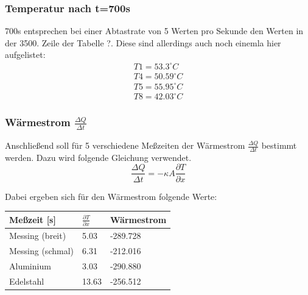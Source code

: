 \subsubsection{Temperatur nach t=700s}

700s entsprechen bei einer Abtastrate von 5 Werten pro Sekunde den Werten in der 3500. Zeile der Tabelle ?. Diese sind allerdings auch noch einemla hier aufgelistet:
\begin{align*}
    T1 = 53.3 ^\circ C  \\
    T4 = 50.59 ^\circ C \\
    T5 = 55.95 ^\circ C \\
    T8 = 42.03 ^\circ C 
\end{align*}

\subsubsection{Wärmestrom $\frac{\Delta Q}{\Delta t}$}

Anschließend soll für 5 verschiedene Meßzeiten der Wärmestrom $\frac{\Delta Q}{\Delta t}$ bestimmt werden. Dazu wird folgende Gleichung verwendet. 
\begin{displaymath}
    \frac{\Delta Q}{\Delta t} = - \kappa A \frac{\partial T}{\partial x}
\end{displaymath}

Dabei ergeben sich für den Wärmestrom folgende Werte: 
\begin{minipage}{\linewidth}
    \begin{table}[H]
        \centering
    \begin{tabular}{lll}
        \toprule
        Meßzeit [s] & $\frac{\partial T}{\partial x}$ & Wärmestrom  \\
        \midrule
        Messing (breit) & 5.03 & -289.728 \\
        Messing (schmal) & 6.31 & -212.016 \\
        Aluminium & 3.03 & -290.880 \\
        Edelstahl & 13.63 & -256.512 \\
        \bottomrule   
    \end{tabular}
    
    \label{tab:1}
\end{table}
\end{minipage}

